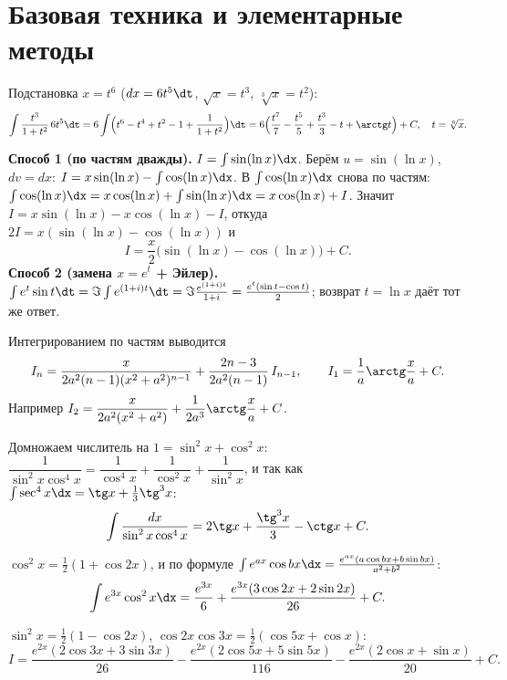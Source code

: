 \section{Базовая техника и элементарные методы}

\sol Подстановка $x=t^6$ ($dx=6t^5\dt$, $\sqrt x=t^3$, $\sqrt[3]{x}=t^2$):
\[
  \int\frac{t^3}{1+t^2}\,6t^5\dt=6\int\Bigl(t^6-t^4+t^2-1+\frac1{1+t^2}\Bigr)\dt
  =6\Bigl(\frac{t^7}{7}-\frac{t^5}{5}+\frac{t^3}{3}-t+\arctg t\Bigr)+C,\quad t=\sqrt[6]{x}.
\]

\sol \textbf{Способ 1 (по частям дважды).} $I=\int\sin(\ln x)\dx$. Берём $u=\sin(\ln x)$, $dv=dx$:
$I=x\sin(\ln x)-\int\cos(\ln x)\dx$. В $\int\cos(\ln x)\dx$ снова по частям:
$\int\cos(\ln x)\dx=x\cos(\ln x)+\int\sin(\ln x)\dx=x\cos(\ln x)+I$. Значит
$I=x\sin(\ln x)-x\cos(\ln x)-I$, откуда $2I=x(\sin(\ln x)-\cos(\ln x))$ и
\[
  I=\frac x2\bigl(\sin(\ln x)-\cos(\ln x)\bigr)+C.
\]
\textbf{Способ 2 (замена $x=e^t$ + Эйлер).} $\int e^t\sin t\dt=\Im\int e^{(1+i)t}\dt
=\Im\frac{e^{(1+i)t}}{1+i}=\frac{e^t(\sin t-\cos t)}{2}$; возврат $t=\ln x$ даёт тот же ответ.

\sol Интегрированием по частям выводится
\[
  I_n=\frac{x}{2a^2(n-1)(x^2+a^2)^{n-1}}+\frac{2n-3}{2a^2(n-1)}\,I_{n-1},
  \qquad I_1=\frac1a\arctg\frac xa+C.
\]
Например $I_2=\dfrac{x}{2a^2(x^2+a^2)}+\dfrac1{2a^3}\arctg\dfrac xa+C$.

\sol Домножаем числитель на $1=\sin^2x+\cos^2x$:
$\dfrac{1}{\sin^2x\cos^4x}=\dfrac1{\cos^4x}+\dfrac1{\cos^2x}+\dfrac1{\sin^2x}$, и так как
$\int\sec^4x\dx=\tg x+\tfrac13\tg^3x$:
\[
  \int\frac{dx}{\sin^2x\cos^4x}=2\tg x+\frac{\tg^3x}{3}-\ctg x+C.
\]

\sol $\cos^2x=\tfrac12(1+\cos2x)$, и по формуле $\int e^{ax}\cos bx\dx=\tfrac{e^{ax}(a\cos bx+b\sin bx)}{a^2+b^2}$:
\[
  \int e^{3x}\cos^2x\dx=\frac{e^{3x}}{6}+\frac{e^{3x}(3\cos2x+2\sin2x)}{26}+C.
\]

\sol $\sin^2x=\tfrac12(1-\cos2x)$, $\cos2x\cos3x=\tfrac12(\cos5x+\cos x)$:
\[
  I=\frac{e^{2x}(2\cos3x+3\sin3x)}{26}-\frac{e^{2x}(2\cos5x+5\sin5x)}{116}
   -\frac{e^{2x}(2\cos x+\sin x)}{20}+C.
\]

